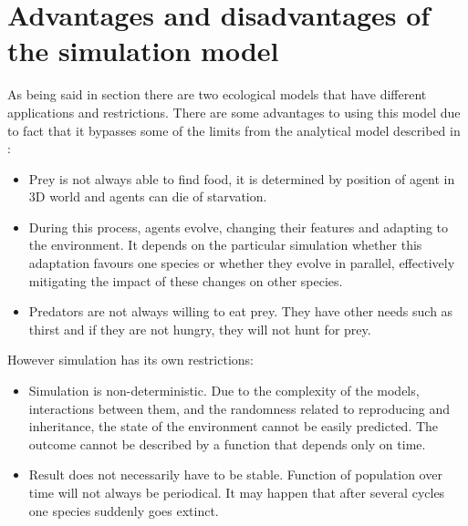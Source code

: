 \section{Advantages and disadvantages of the simulation model}
As being said in section  there are two ecological models that have different applications and restrictions.
There are some advantages to using this model due to fact that it bypasses some of the limits from the analytical model described in :
\begin{itemize}
    \item Prey is not always able to find food, it is determined by position of agent in 3D world and agents can die of starvation.
    \item During this process, agents evolve, changing their features and adapting to the environment. It depends on the particular simulation whether this adaptation favours one species or whether they evolve in parallel, effectively mitigating the impact of these changes on other species.
    \item Predators are not always willing to eat prey. They have other needs such as thirst and if they are not hungry, they will not hunt for prey.
\end{itemize}

However simulation has its own restrictions:
\begin{itemize}
    \item Simulation is non-deterministic. Due to the complexity of the models, interactions between them, and the randomness related to reproducing and inheritance, the state of the environment cannot be easily predicted. The outcome cannot be described by a function that depends only on time.
    \item Result does not necessarily have to be stable. Function of population over time will not always be periodical. It may happen that after several cycles one species suddenly goes extinct.
\end{itemize}